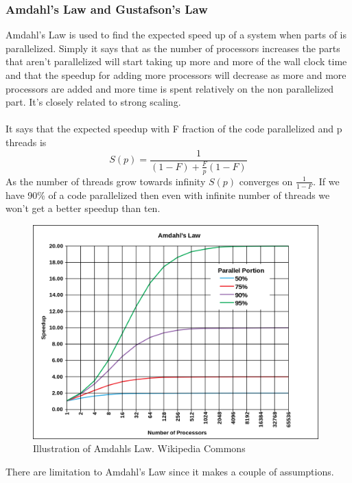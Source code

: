 \documentclass[10pt,a4paper]{article}
\begin{document}
\subsubsection{Amdahl's Law and Gustafson's Law}
Amdahl's Law is used to find the expected speed up of a system when parts of is parallelized. Simply it says that as the number of processors increases the parts that aren't parallelized will start taking up more and more of the wall clock time and that the speedup for adding more processors will decrease as more and more processors are added and more time is spent relatively on the non parallelized part. It's closely related to strong scaling.\cite{cuda_best_practice,2010_reevaluating_amdahl}\\
\\
It says that the expected speedup with F fraction of the code parallelized and p threads is 
$$S(p)=\frac{1}{(1-F)+\frac{F}{p}(1-F)}$$
As the number of threads grow towards infinity $S(p)$ converges on $\frac{1}{1-F}$. If we have 90\% of a code parallelized then even with infinite number of threads we won't get a better speedup than ten.\cite{2010_reevaluating_amdahl}

\begin{figure}[h]
    \centering
    \includegraphics[width=11cm]{AmdahlsLaw.png}
    \caption{Illustration of Amdahls Law. Wikipedia Commons}
    \label{fig:AmdahlsLaw}
\end{figure}

There are limitation to Amdahl's Law since it makes a couple of assumptions.
\end{document}
